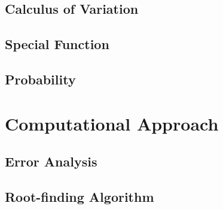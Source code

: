 \documentclass[10pt]{report}
\begin{document}
\section{Calculus of Variation}

\clearpage

\clearpage

\section{Special Function}

\clearpage

\section{Probability}

\clearpage

\chapter{Computational Approach}
\clearpage
\section{Error Analysis}


\section{Root-finding Algorithm}

\printbibliography
\end{document}
